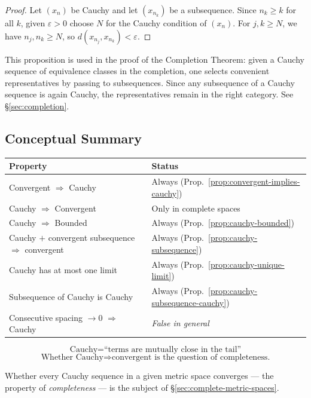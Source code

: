 \begin{proof}
Let $(x_n)$ be Cauchy and let $(x_{n_k})$ be a subsequence.
Since $n_k \ge k$ for all $k$, given $\varepsilon > 0$ choose $N$ for the
Cauchy condition of $(x_n)$.
For $j, k \ge N$, we have $n_j, n_k \ge N$, so
$d(x_{n_j}, x_{n_k}) < \varepsilon$.
\end{proof}

\begin{remark*}
This proposition is used in the proof of the Completion Theorem: given a
Cauchy sequence of equivalence classes in the completion, one selects
convenient representatives by passing to subsequences.
Since any subsequence of a Cauchy sequence is again Cauchy, the
representatives remain in the right category.
See \hyperref[sec:completion]{\S\ref*{sec:completion}}.
\end{remark*}

\subsection{Conceptual Summary}
\label{sec:cauchy-summary}

\begin{center}
\begin{tabular}{l l}
\toprule
\textbf{Property} & \textbf{Status} \\
\midrule
Convergent $\Rightarrow$ Cauchy & Always (Prop.~\ref{prop:convergent-implies-cauchy}) \\
Cauchy $\Rightarrow$ Convergent & Only in complete spaces \\
Cauchy $\Rightarrow$ Bounded    & Always (Prop.~\ref{prop:cauchy-bounded}) \\
Cauchy $+$ convergent subsequence $\Rightarrow$ convergent
  & Always (Prop.~\ref{prop:cauchy-subsequence}) \\
Cauchy has at most one limit    & Always (Prop.~\ref{prop:cauchy-unique-limit}) \\
Subsequence of Cauchy is Cauchy & Always (Prop.~\ref{prop:cauchy-subsequence-cauchy}) \\
Consecutive spacing $\to 0$ $\Rightarrow$ Cauchy & \emph{False in general} \\
\bottomrule
\end{tabular}
\end{center}

\begin{center}
\[
  \boxed{
    \text{Cauchy} = \text{``terms are mutually close in the tail''}
  }
\]
\[
  \boxed{
    \text{Whether Cauchy} \Rightarrow \text{convergent is the question of completeness.}
  }
\]
\end{center}

\begin{remark*}
Whether every Cauchy sequence in a given metric space converges --- the
property of \emph{completeness} --- is the subject of
\hyperref[sec:complete-metric-spaces]{\S\ref*{sec:complete-metric-spaces}}.
\end{remark*}